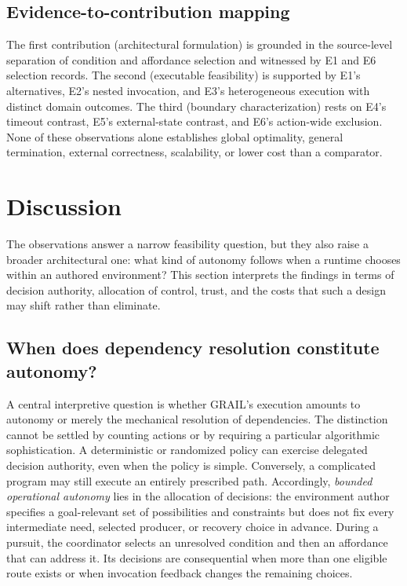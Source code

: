 \documentclass[11pt]{article}
\begin{document}
\subsection{Evidence-to-contribution mapping}
The first contribution (architectural formulation) is grounded in the source-level separation of condition and affordance selection and witnessed by E1 and E6 selection records. The second (executable feasibility) is supported by E1's alternatives, E2's nested invocation, and E3's heterogeneous execution with distinct domain outcomes. The third (boundary characterization) rests on E4's timeout contrast, E5's external-state contrast, and E6's action-wide exclusion. None of these observations alone establishes global optimality, general termination, external correctness, scalability, or lower cost than a comparator.

\section{Discussion}
The observations answer a narrow feasibility question, but they also raise a broader architectural one: what kind of autonomy follows when a runtime chooses within an authored environment? This section interprets the findings in terms of decision authority, allocation of control, trust, and the costs that such a design may shift rather than eliminate.

\subsection{When does dependency resolution constitute autonomy?}
A central interpretive question is whether GRAIL's execution amounts to autonomy or merely the mechanical resolution of dependencies. The distinction cannot be settled by counting actions or by requiring a particular algorithmic sophistication. A deterministic or randomized policy can exercise delegated decision authority, even when the policy is simple. Conversely, a complicated program may still execute an entirely prescribed path. Accordingly, \emph{bounded operational autonomy} lies in the allocation of decisions: the environment author specifies a goal-relevant set of possibilities and constraints but does not fix every intermediate need, selected producer, or recovery choice in advance. During a pursuit, the coordinator selects an unresolved condition and then an affordance that can address it. Its decisions are consequential when more than one eligible route exists or when invocation feedback changes the remaining choices.
\end{document}
